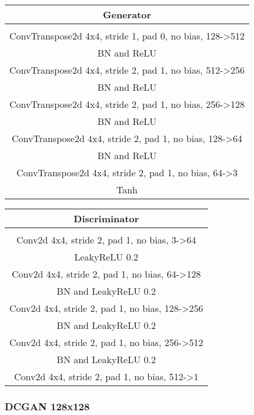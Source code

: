 \documentclass{article}
\begin{document}
\begin{tabular}{c}
	Generator \\
	\toprule\midrule
	 \\
	\midrule
	ConvTranspose2d 4x4, stride 1, pad 0, no bias, 128->512 \\
	\midrule
	BN and ReLU \\
	\midrule
	ConvTranspose2d 4x4, stride 2, pad 1, no bias, 512->256 \\
	\midrule
	BN and ReLU \\
	\midrule
	ConvTranspose2d 4x4, stride 2, pad 1, no bias, 256->128 \\
	\midrule
	BN and ReLU \\
	\midrule
	ConvTranspose2d 4x4, stride 2, pad 1, no bias, 128->64 \\
	\midrule
	BN and ReLU \\
	\midrule
	ConvTranspose2d 4x4, stride 2, pad 1, no bias, 64->3 \\
	\midrule
	Tanh \\
	\bottomrule
\end{tabular} 
\quad
\begin{tabular}{c}
	Discriminator \\
	\toprule\midrule
	 \\
	\midrule
	Conv2d 4x4, stride 2, pad 1, no bias, 3->64 \\
	\midrule
	LeakyReLU 0.2 \\
	\midrule
	Conv2d 4x4, stride 2, pad 1, no bias, 64->128 \\
	\midrule
	BN and LeakyReLU 0.2 \\
	\midrule
	Conv2d 4x4, stride 2, pad 1, no bias, 128->256 \\
	\midrule
	BN and LeakyReLU 0.2 \\
	\midrule
	Conv2d 4x4, stride 2, pad 1, no bias, 256->512 \\
	\midrule
	BN and LeakyReLU 0.2 \\
	\midrule
	Conv2d 4x4, stride 2, pad 1, no bias, 512->1 \\
	\bottomrule
\end{tabular}

\subsubsection{DCGAN 128x128}
\end{document}
